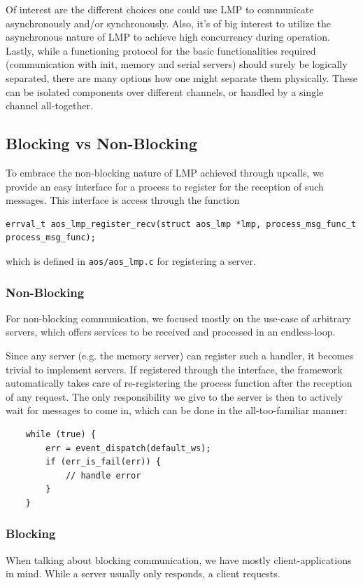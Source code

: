 Of interest are the different choices one could use LMP to communicate asynchronously and/or 
synchronously. Also, it's of big interest to utilize the asynchronous nature of LMP to
achieve high concurrency during operation. Lastly, while a functioning protocol for the basic
functionalities required (communication with init, memory and serial servers) 
should surely be logically separated, there are many options how one might separate them physically.
These can be isolated components over different channels, or handled by a single channel all-together.

\subsection{Blocking vs Non-Blocking}
To embrace the non-blocking nature of LMP achieved through upcalls, we provide an 
easy interface for a process to register for the reception of such messages. This interface is 
access through the function 
\begin{verbatim}
errval_t aos_lmp_register_recv(struct aos_lmp *lmp, process_msg_func_t process_msg_func);
\end{verbatim}
which is defined in \texttt{aos/aos\_lmp.c} for registering a server.

\subsubsection{Non-Blocking}
For non-blocking communication, we focused mostly on the use-case of arbitrary servers, 
which offers services to be received and processed in an endless-loop.

Since any server (e.g. the memory server) can register such a handler, it becomes trivial to 
implement servers. If registered through the interface, the framework automatically takes care of 
re-registering the process function after the reception of any request. 
The only responsibility we give to the server is then to actively wait for 
messages to come in, which can be done in the all-too-familiar manner:

\begin{verbatim}
    while (true) {
        err = event_dispatch(default_ws);
        if (err_is_fail(err)) {
            // handle error
        }
    }
\end{verbatim}

\subsubsection{Blocking}
When talking about blocking communication, we have mostly client-applications in mind. 
While a server usually only responds, a client requests.

